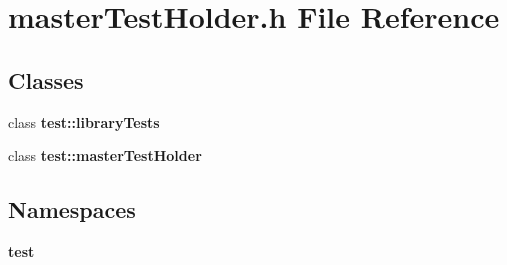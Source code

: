 \section{master\+Test\+Holder.\+h File Reference}
\label{masterTestHolder_8h}
\subsection*{Classes}
\begin{DoxyCompactItemize}
\item 
class {\bf test\+::library\+Tests}
\item 
class {\bf test\+::master\+Test\+Holder}
\end{DoxyCompactItemize}
\subsection*{Namespaces}
\begin{DoxyCompactItemize}
\item 
 {\bf test}
\end{DoxyCompactItemize}
